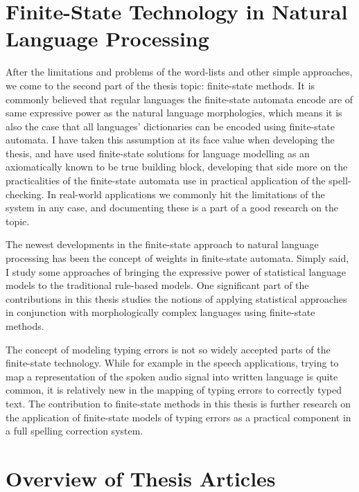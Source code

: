 \documentclass[officiallayout]{unihelcompling}
\begin{document}
\section{Finite-State Technology in Natural Language Processing}
\label{sec:finite-state-technology-in-nlp}

After the limitations and problems of the word-lists and other simple
approaches, we come to the second part of the thesis topic: finite-state
methods.  It is commonly believed that regular languages the finite-state
automata encode are of same expressive power as the natural language
morphologies, which means it is also the case that all languages' dictionaries
can be encoded using finite-state automata. I have taken this assumption at its
face value when developing the thesis, and have used finite-state solutions for
language modelling as an axiomatically known to be true building block,
developing that side more on the practicalities of the finite-state automata
use in practical application of the spell-checking. In real-world applications
we commonly hit the limitations of the system in any case, and documenting
these is a part of a good research on the topic.

The newest developments in the finite-state approach to natural language
processing has been the concept of weights in finite-state automata.  Simply
said, I study some approaches of bringing the expressive power of statistical
language models to the traditional rule-based models. One significant part of
the contributions in this thesis studies the notions of applying statistical
approaches in conjunction with morphologically complex languages using
finite-state methods.

The concept of modeling typing errors is not so widely accepted parts of the
finite-state technology. While for example in the speech applications, trying
to map a representation of the spoken audio signal into written language is
quite common, it is relatively new in the mapping of typing errors to correctly
typed text. The contribution to finite-state methods in this thesis is further
research on the application of finite-state models of typing errors as
a practical component in a full spelling correction system.


\section{Overview of Thesis Articles}
\label{sec:articles}
\end{document}
